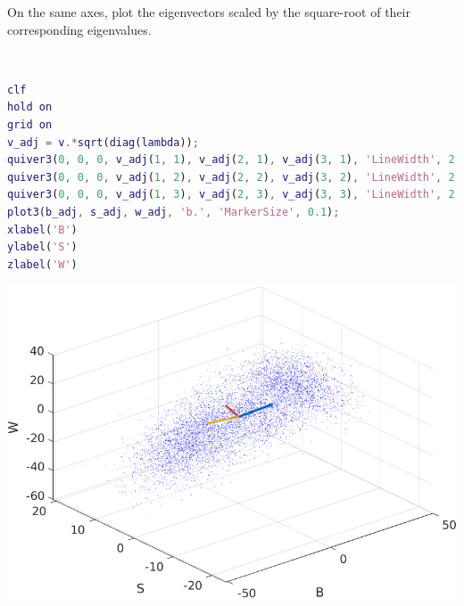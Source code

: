 On the same axes, plot the eigenvectors scaled by the square-root of their corresponding eigenvalues.

\begin{solution} \
    \begin{lstlisting}[language=Matlab]
clf
hold on
grid on
v_adj = v.*sqrt(diag(lambda));
quiver3(0, 0, 0, v_adj(1, 1), v_adj(2, 1), v_adj(3, 1), 'LineWidth', 2)
quiver3(0, 0, 0, v_adj(1, 2), v_adj(2, 2), v_adj(3, 2), 'LineWidth', 2)
quiver3(0, 0, 0, v_adj(1, 3), v_adj(2, 3), v_adj(3, 3), 'LineWidth', 2)
plot3(b_adj, s_adj, w_adj, 'b.', 'MarkerSize', 0.1);
xlabel('B')
ylabel('S')
zlabel('W')
    \end{lstlisting}
    
    \begin{center}
        \includegraphics[width=.7\textwidth]{img/e10p4.png}
    \end{center}
\end{solution}